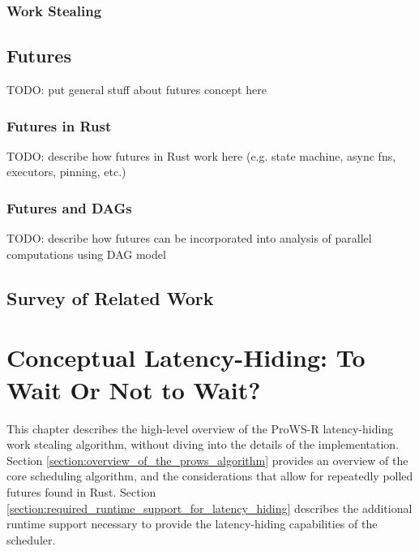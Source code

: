 \documentclass[bsc,frontabs,singlespacing,parskip,deptreport,normalheadings]{infthesis}
\begin{document}
\subsection{Work Stealing}
\label{subsection:work_stealing}

\section{Futures}
\label{section:futures}

TODO: put general stuff about futures concept here

\subsection{Futures in Rust}
\label{subsection:futures_in_rust}

TODO: describe how futures in Rust work here (e.g. state machine, async fns,
executors, pinning, etc.)

\subsection{Futures and DAGs}

TODO: describe how futures can be incorporated into analysis of parallel
computations using DAG model

\section{Survey of Related Work}


\chapter{Conceptual Latency-Hiding: To Wait Or Not to Wait?}
\label{chapter:conceptual_latency-hiding:_to_wait_or_not_to_wait?}

This chapter describes the high-level overview of the ProWS-R latency-hiding
work stealing algorithm, without diving into the details of the implementation.
Section \ref{section:overview_of_the_prows_algorithm} provides an overview of
the core scheduling algorithm, and the considerations that allow for repeatedly
polled futures found in Rust. Section
\ref{section:required_runtime_support_for_latency_hiding} describes the
additional runtime support necessary to provide the latency-hiding capabilities
of the scheduler.
\end{document}
